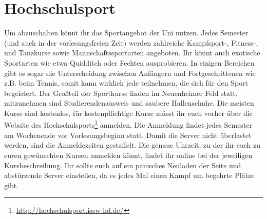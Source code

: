 \section{Hochschulsport}
Um abzuschalten könnt ihr das Sportangebot der Uni nutzen. Jedes Semester (und auch in der vorlesungsfreien Zeit) werden zahlreiche Kampfsport-, Fitness-, und Tanzkurse sowie Mannschaftssportarten angeboten. Ihr könnt auch exotische Sportarten wie etwa Quidditch oder Fechten ausprobieren. In einigen Bereichen gibt es sogar die Unterscheidung zwischen Anfängern und Fortgeschrittenen wie z.B. beim Tennis, somit kann wirklich jede teilnehmen, die sich für den Sport begeistert.
Der Großteil der Sportkurse finden im Neuenheimer Feld statt, mitzunehmen sind Studierendenausweis und saubere Hallenschuhe.
Die meisten Kurse sind kostenlos, für kostenpflichtige Kurse müsst ihr euch vorher über die Website des Hochschulsports\footnote{\url{http://hochschulsport.issw-hd.de/}} anmelden. Die Anmeldung findet jedes Semester am Wochenende vor Vorlesungsbeginn statt. Damit die Server nicht überlastet werden, sind die Anmeldezeiten gestaffelt. Die genaue Uhrzeit, zu der ihr euch zu euren gewünschten Kursen anmelden könnt, findet ihr online bei der jeweiligen Kursbeschreibung. Ihr sollte euch auf ein panisches Neuladen der Seite und abstürzende Server einstellen, da es jedes Mal einen Kampf um begehrte Plätze gibt.
